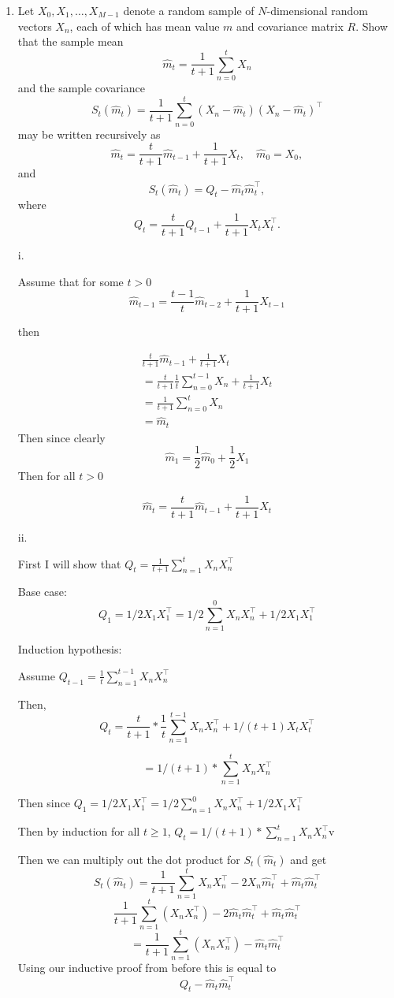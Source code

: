 \documentclass{article}
\begin{document}
\begin{enumerate}

\item
Let $X_0, X_1, \ldots, X_{M-1}$ denote a random sample of $N$-dimensional random vectors $X_n$, each of which has mean value $m$ and covariance matrix $R$.  Show that the sample mean
$$\hat m_t = \frac{1}{t+1} \sum_{n=0}^t  X_n$$
and the sample covariance 
$$S_t(\hat m_t) = \frac{1}{t+1} \sum_{n=0}^t (X_n - \hat m_t)(X_n - \hat m_t)^\top$$
may be written recursively as
$$\hat m_t = \frac{t}{t+1} \hat m_{t-1} + \frac{1}{t+1} X_t, \quad \hat m_0 = X_0,$$
and
$$S_t(\hat m_t) = Q_t - \hat m_t \hat m_t^\top,$$
where
$$ Q_t  = \frac{t}{t+1} Q_{t-1} + \frac{1}{t+1} X_t X_t^\top.$$

\color{blue}
i.

Assume that for some $t>0$ 
$$
\hat{m}_{t-1} = \frac{t-1}{t} \hat m_{t-2} + \frac{1}{t+1}X_{t-1}
$$

then 

\begin{align*}
\frac{t}{t+1} \hat m_{t-1} + \frac{1}{t+1}X_t\\
= \frac{t}{t+1} \frac{1}{t} \sum_{n=0}^{t-1} X_n + \frac{1}{t+1}X_t\\
= \frac{1}{t+1} \sum_{n=0}^t  X_n \\
=\hat m_t
\end{align*}
Then since clearly
\[
\hat m_1 = \frac{1}{2} \hat m_0 + \frac{1}{2} X_1
\]
Then for all $t>0$

$$\hat m_t = \frac{t}{t+1} \hat m_{t-1} + \frac{1}{t+1} X_t
$$

ii. 

First I will show that
$Q_t = \frac{1}{t+1}  \sum_{n=1}^t X_n X_n^\top$

Base case:
$$
Q_1 = 1/2 X_1 X_1^\top = 1/2\sum_{n=1}^0 X_n X_n^\top + 1/2 X_1 X_1^\top
$$

Induction hypothesis:

Assume $Q_{t-1} = \frac{1}{t} \sum_{n=1}^{t-1} X_n X_n^\top$ 

Then, 
$$
Q_t = \frac{t}{t+1} * \frac{1}{t} \sum_{n=1} ^{t-1} X_n X_n^\top + 1/(t+1) X_t X_t ^\top
$$

$$
= 1/(t+1) * \sum_{n=1}^t X_n X_n^\top
$$

Then since $Q_1 = 1/2 X_1 X_1^\top = 1/2\sum_{n=1}^0 X_n X_n^\top + 1/2 X_1 X_1^\top$

Then by induction for all $t \geq 1$, $Q_t = 1/(t+1) * \sum_{n=1}^t X_n X_n^\top$v

Then we can multiply out the dot product for $S_t(\hat m_t)$ and get
$$
S_t(\hat m_t) = \frac{1}{t+1} \sum_{n=1} ^ t X_n X_n^\top -2X_n \hat m_t ^\top + \hat m_t \hat m_t^\top
$$
$$
\frac{1}{t+1} \sum_{n=1} ^ t (X_n X_n^\top) -2\hat m_t \hat m_t^\top + \hat m_t \hat m_t^\top
$$
$$
 = \frac{1}{t+1} \sum_{n=1} ^ t (X_n X_n^\top)  - \hat m_t \hat m_t^\top
$$
Using our inductive proof from before this is equal to 
$$
Q_t - \hat m_t \hat m_t^\top
$$


\end{enumerate}
\end{document}
